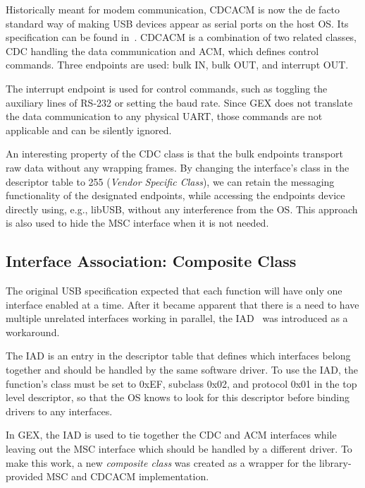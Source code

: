 
Historically meant for modem communication, \gls{CDCACM} is now the de facto standard way of making \gls{USB} devices appear as serial ports on the host \gls{OS}. Its specification can be found in~\cite{usbif-cdc}. \gls{CDCACM} is a combination of two related classes, \gls{CDC} handling the data communication and \gls{ACM}, which defines control commands. Three endpoints are used: bulk IN, bulk OUT, and interrupt OUT.

The interrupt endpoint is used for control commands, such as toggling the auxiliary lines of RS-232 or setting the baud rate. Since GEX does not translate the data communication to any physical UART, those commands are not applicable and can be silently ignored.

An interesting property of the \gls{CDC} class is that the bulk endpoints transport raw data without any wrapping frames. By changing the interface's class in the descriptor table to 255 (\textit{Vendor Specific Class}), we can retain the messaging functionality of the designated endpoints, while accessing the endpoints device directly using, e.g., libUSB, without any interference from the \gls{OS}. This approach is also used to hide the \gls{MSC} interface when it is not needed.

\subsection{Interface Association: Composite Class}

The original \gls{USB} specification expected that each function will have only one interface enabled at a time. After it became apparent that there is a need to have multiple unrelated interfaces working in parallel, the \gls{IAD}~\cite{usbif-iad} was introduced as a workaround.

The \gls{IAD} is an entry in the descriptor table that defines which interfaces belong together and should be handled by the same software driver. To use the \gls{IAD}, the function's class must be set to 0xEF, subclass 0x02, and protocol 0x01 in the top level descriptor, so that the \gls{OS} knows to look for this descriptor before binding drivers to any interfaces.

In GEX, the \gls{IAD} is used to tie together the \gls{CDC} and \gls{ACM} interfaces while leaving out the \gls{MSC} interface which should be handled by a different driver. To make this work, a new \textit{composite class} was created as a wrapper for the library-provided \gls{MSC} and \gls{CDCACM} implementation.

